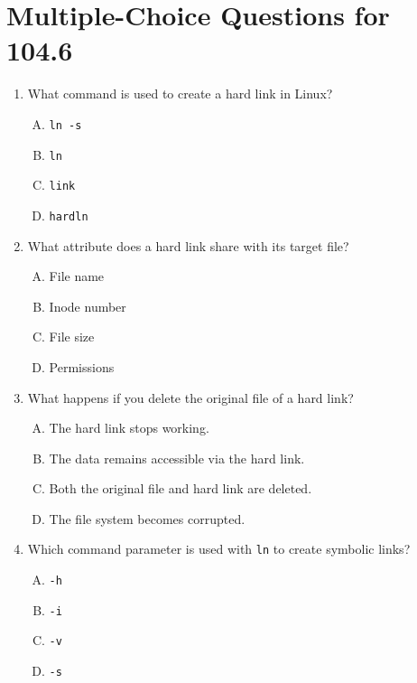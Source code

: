 \documentclass[a4paper]{report}
\begin{document}
\newpage
\section*{Multiple-Choice Questions for 104.6}
\begin{enumerate}[1.]

    \item What command is used to create a hard link in Linux?  
    \begin{enumerate}[A)]
        \item \texttt{ln -s}  
        \item \texttt{ln}  
        \item \texttt{link}  
        \item \texttt{hardln}  
    \end{enumerate}

    \item What attribute does a hard link share with its target file?  
    \begin{enumerate}[A)]
        \item File name  
        \item Inode number  
        \item File size  
        \item Permissions  
    \end{enumerate}

    \item What happens if you delete the original file of a hard link?  
    \begin{enumerate}[A)]
        \item The hard link stops working.  
        \item The data remains accessible via the hard link.  
        \item Both the original file and hard link are deleted.  
        \item The file system becomes corrupted.  
    \end{enumerate}

    \item Which command parameter is used with \texttt{ln} to create symbolic links?  
    \begin{enumerate}[A)]
        \item \texttt{-h}  
        \item \texttt{-i}  
        \item \texttt{-v}  
        \item \texttt{-s}  
    \end{enumerate}


\end{enumerate}
\end{document}
